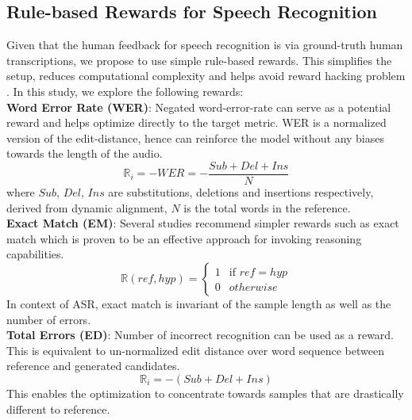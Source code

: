 \documentclass[conference]{IEEEtran}
\begin{document}
\subsection{Rule-based Rewards for Speech Recognition}
Given that the human feedback for speech recognition is via ground-truth human transcriptions, we propose to use simple rule-based rewards.
This simplifies the setup, reduces computational complexity and helps avoid reward hacking problem \cite{everitt2017reinforcement}.
In this study, we explore the following rewards:\\
\textbf{Word Error Rate (WER)}: Negated word-error-rate can serve as a potential reward and helps optimize directly to the target metric. WER is a normalized version of the edit-distance, hence can reinforce the model without any biases towards the length of the audio.
\begin{equation}
\mathbb{R}_i = -WER = -\frac{Sub + Del + Ins}{N}
\end{equation}
where $Sub$, $Del$, $Ins$ are substitutions, deletions and insertions respectively, derived from dynamic alignment, $N$ is the total words in the reference.\\
\textbf{Exact Match (EM)}: Several studies \cite{yu2025dapo} recommend simpler rewards such as exact match which is proven to be an effective approach for invoking reasoning capabilities.
\begin{equation}
\mathbb{R}(ref, hyp) = 
\begin{cases}
1 & \text{if  } ref = hyp \\
0 & otherwise
\end{cases}
\end{equation}
In context of ASR, exact match is invariant of the sample length as well as the number of errors.\\
\textbf{Total Errors (ED)}: Number of incorrect recognition can be used as a reward. This is equivalent to un-normalized edit distance over word sequence between reference and generated candidates.
\begin{equation}
\mathbb{R}_i = -(Sub + Del + Ins)
\end{equation}
This enables the optimization to concentrate towards samples that are drastically different to reference.
\end{document}
